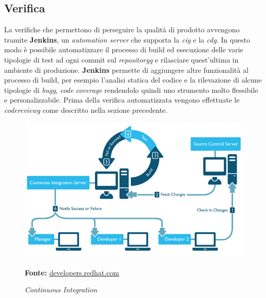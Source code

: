 \newpage

\subsection{Verifica}
    La verifiche che permettono di perseguire la qualità di prodotto avvengono tramite \textbf{Jenkins}, un \textit{automation server} che supporta la \textit{\gls{cig}} e la \textit{\gls{cdg}}.
    In questo modo è possibile automatizzare il processo di build ed esecuzione delle varie tipologie di test ad ogni commit sul \textit{\gls{repositoryg}} e rilasciare quest'ultima in ambiente di produzione.
    \textbf{Jenkins} permette di aggiungere altre funzionalità al processo di build, per esempio l'analisi statica del codice e la rilevazione di alcune tipologie di \textit{\gls{bugg}}, \textit{code coverage} rendendolo quindi uno strumento molto flessibile e personalizzabile.
    Prima della verifica automatizzata vengono effettuate le \textit{\gls{codereviewg}} come descritto nella sezione precedente.
    

    \begin{figure}[h]
        \centering
        \includegraphics[width=1\textwidth]{immagini/ci.png}
        \caption{\textit{Continuous Integration}}
        \textbf{Fonte:} \href{https://developers.redhat.com/blog/2017/09/06/continuous-integration-a-typical-process/}{developers.redhat.com}
        \label{fig: Continuous Integration}
    \end{figure}
